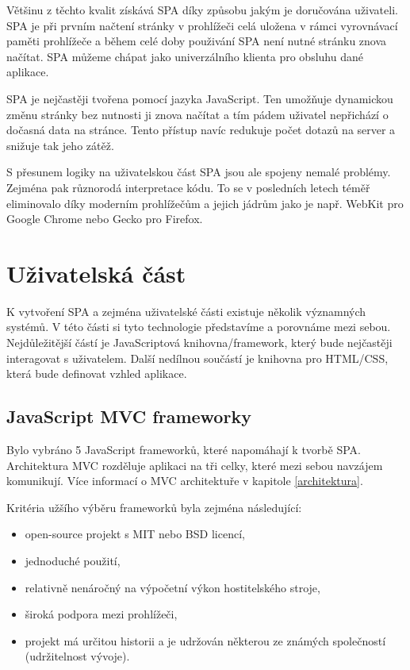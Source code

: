 Většinu z těchto kvalit získává SPA díky způsobu jakým je doručována uživateli. SPA je při prvním načtení stránky v prohlížeči celá uložena v rámci vyrovnávací paměti prohlížeče a během celé doby použivání SPA není nutné stránku znova načítat. SPA můžeme chápat jako univerzálního klienta pro obsluhu dané aplikace. 

SPA je nejčastěji tvořena pomocí jazyka JavaScript. Ten umožňuje dynamickou změnu stránky bez nutnosti ji znova načítat a tím pádem uživatel nepřichází o dočasná data na stránce. Tento přístup navíc redukuje počet dotazů na server a snižuje tak jeho zátěž.

S přesunem logiky na uživatelskou část SPA jsou ale spojeny nemalé problémy. Zejména pak různorodá interpretace kódu. To se v posledních letech téměř eliminovalo díky moderním prohlížečům a jejich jádrům jako je např. WebKit pro Google Chrome nebo Gecko pro Firefox.

\section{Uživatelská část}

K vytvoření SPA a zejména uživatelské části existuje několik významných systémů. V této části si tyto technologie představíme a porovnáme mezi sebou. Nejdůležitější částí je JavaScriptová knihovna/framework, který bude nejčastěji interagovat s uživatelem. Další nedílnou součástí je knihovna pro HTML/CSS, která bude definovat vzhled aplikace.

\subsection{JavaScript MVC frameworky}

Bylo vybráno 5 JavaScript frameworků, které napomáhají k tvorbě SPA. Architektura MVC rozděluje aplikaci na tři celky, které mezi sebou navzájem komunikují. Více informací o MVC architektuře v kapitole \ref{architektura}.

Kritéria užšího výběru frameworků byla zejména následující:

\begin{itemize}  
\item open-source projekt s MIT nebo BSD licencí,
\item jednoduché použití,
\item relativně nenáročný na výpočetní výkon hostitelského stroje,
\item široká podpora mezi prohlížeči,
\item projekt má určitou historii a je udržován některou ze známých společností (udržitelnost vývoje).
\end{itemize}

